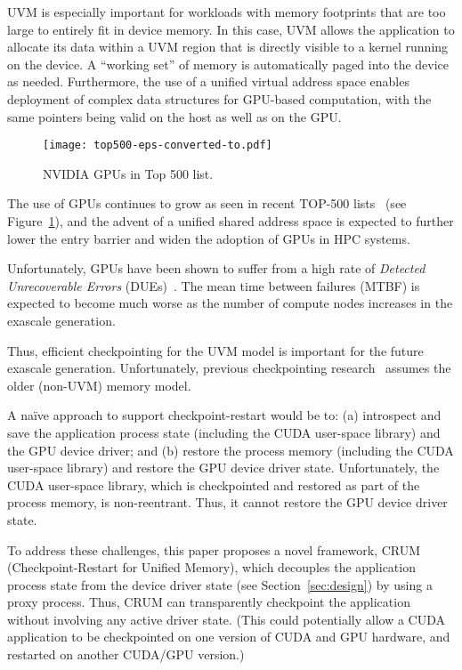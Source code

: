 \documentclass[11pt]{article}
\begin{document}
UVM is especially important for workloads with memory footprints that
are too large to entirely fit in device memory.
In this case, UVM allows the application to allocate its data within a UVM
region that is directly visible to a kernel running on the device.
A ``working set'' of memory is automatically paged into the device
as needed.  Furthermore, the use of a unified
virtual address space enables deployment of complex data structures for
GPU-based computation, with the same pointers being valid on the host as well
as on the GPU.

\begin{figure}[t!]
\centering
\texttt{[image: top500-eps-converted-to.pdf]}
  \caption{NVIDIA GPUs in Top 500 list.}
\label{fig:top}
  \vspace{-0.5cm}
\end{figure}

The use of GPUs continues to grow as seen in recent TOP-500
lists~\cite{top500-2017} (see Figure~\ref{fig:top}), and the advent of a
unified shared address space is expected to further lower the entry barrier
and widen the adoption of GPUs in HPC systems.

Unfortunately, GPUs have been shown to suffer from
a high rate of {\em Detected Unrecoverable Errors}
(DUEs)~\cite{haque2010hard,shi2011sustainable,debardeleben2014gpu,
tiwari2015reliability,tiwari2015understanding,sridharan2015memory}.  The mean
time between failures (MTBF) is expected to become much worse as the number of
compute nodes increases in the exascale generation.

Thus, efficient checkpointing for the UVM model is important for the future
exascale generation. Unfortunately, previous checkpointing
research~\cite{shi2009vcuda,gupta2009gvim,takizawa2009checuda,
gomez2010transparent,nukada2011nvcr,gtc2016crcuda}  assumes the older
(non-UVM) memory model.

A na{\"i}ve approach to support checkpoint-restart would be to: (a)
introspect and save the application process state (including the CUDA
user-space library) and the GPU device driver; and (b) restore the
process memory (including the CUDA user-space library) and restore the
GPU device driver state. Unfortunately, the CUDA user-space library,
which is checkpointed and restored as part of the process memory, is
non-reentrant. Thus, it cannot restore the GPU device driver state.


To address these challenges, this paper proposes a novel framework, CRUM
(Checkpoint-Restart for Unified Memory), which decouples the application process
state from the device driver state (see Section~\ref{sec:design}) by using a proxy process.
Thus, CRUM can transparently checkpoint the application without involving
any active driver state. (This could potentially allow a CUDA application to be
checkpointed on one version of CUDA and GPU hardware, and restarted on another
CUDA/GPU version.)
\end{document}
